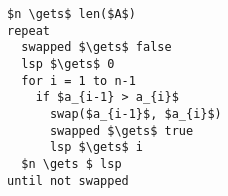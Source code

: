 \begin{lstlisting}[style = code]
$n \gets$ len($A$)
repeat
  swapped $\gets$ false
  lsp $\gets$ 0
  for i = 1 to n-1
    if $a_{i-1} > a_{i}$
      swap($a_{i-1}$, $a_{i}$)
      swapped $\gets$ true
      lsp $\gets$ i
  $n \gets $ lsp
until not swapped
\end{lstlisting}
